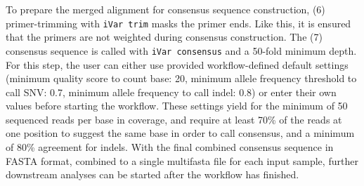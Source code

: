 To prepare the merged alignment for consensus sequence construction, (6) primer-trimming with \texttt{iVar trim} masks the primer ends. Like this, it is ensured that the primers are not weighted during consensus construction. The (7) consensus sequence is called with \texttt{iVar consensus} and a 50-fold minimum depth. For this step, the user can either use provided workflow-defined default settings (minimum quality score to count base: 20, minimum allele frequency threshold to call \ac{SNV}: 0.7, minimum allele frequency to call indel: 0.8) or enter their own values before starting the workflow. These settings yield for the minimum of 50 sequenced reads per base in coverage, and require at least 70\% of the reads at one position to suggest the same base in order to call consensus, and a minimum of 80\% agreement for indels. With the final combined consensus sequence in FASTA format, combined to a single multifasta file for each input sample, further downstream analyses can be started after the workflow has finished.

